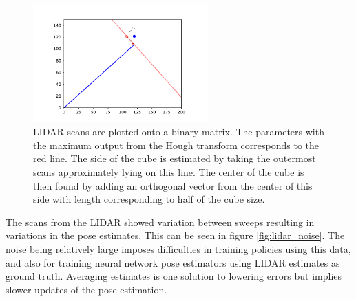 \begin{figure}[h]
    \centering
    \includegraphics[width=0.60\textwidth]{res/hough_example.pdf}

    \caption{LIDAR scans are plotted onto a binary matrix. The parameters with
    the maximum output from the Hough transform corresponds to the red line.
    The side of the cube is estimated by taking the outermost scans
    approximately lying on this line. The center of the cube is then found by
    adding an orthogonal vector from the center of this side with length
    corresponding to half of the cube size.}

    \label{fig:hough_example}
\end{figure}

The scans from the LIDAR showed variation between sweeps resulting in
variations in the pose estimates. This can be seen in figure
\ref{fig:lidar_noise}. The noise being relatively large imposes difficulties in
training policies using this data, and also for training neural network pose
estimators using LIDAR estimates as ground truth. Averaging estimates is one
solution to lowering errors but implies slower updates of the pose estimation.

